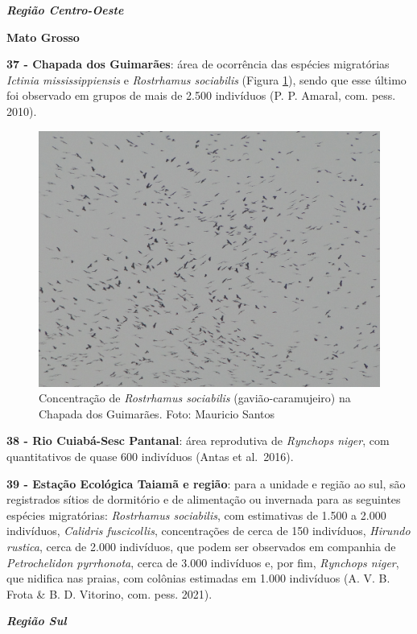 \documentclass[
  oneside]{scrbook}
\begin{document}
\textbf{\emph{Região Centro-Oeste}}

\textbf{Mato Grosso}

\textbf{37 - Chapada dos Guimarães}: área de ocorrência das espécies migratórias \emph{Ictinia mississippiensis} e \emph{Rostrhamus sociabilis} (Figura \ref{fig:26}), sendo que esse último foi observado em grupos de mais de 2.500 indivíduos (P. P. Amaral, com. pess. 2010).

\begin{figure}[H]

{\centering \includegraphics[width=0.75\linewidth]{imagens/cap07/Figura_7.6} 

}

\caption{Concentração de \emph{Rostrhamus sociabilis} (gavião-caramujeiro) na Chapada dos Guimarães. Foto: Mauricio Santos}\label{fig:26}
\end{figure}



\textbf{38 - Rio Cuiabá-Sesc Pantanal}: área reprodutiva de \emph{Rynchops niger}, com quantitativos de quase 600 indivíduos (Antas et al.~2016).

\textbf{39 - Estação Ecológica Taiamã e região}: para a unidade e região ao sul, são registrados sítios de dormitório e de alimentação ou invernada para as seguintes espécies migratórias: \emph{Rostrhamus sociabilis}, com estimativas de 1.500 a 2.000 indivíduos, \emph{Calidris fuscicollis}, concentrações de cerca de 150 indivíduos, \emph{Hirundo rustica}, cerca de 2.000 indivíduos, que podem ser observados em companhia de \emph{Petrochelidon pyrrhonota}, cerca de 3.000 indivíduos e, por fim, \emph{Rynchops niger}, que nidifica nas praias, com colônias estimadas em 1.000 indivíduos (A. V. B. Frota \& B. D. Vitorino, com. pess. 2021).

\textbf{\emph{Região Sul}}
\end{document}
